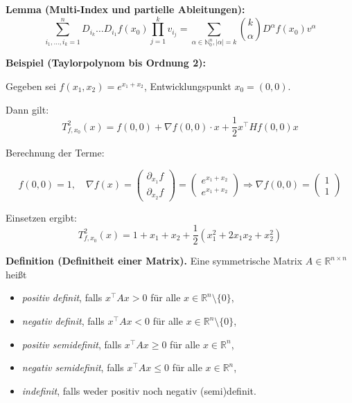 \textbf{Lemma (Multi-Index und partielle Ableitungen):}
\[
\sum_{i_1, \dots, i_k=1}^n D_{i_k} \dots D_{i_1} f(x_0) \prod_{j=1}^k v_{i_j} 
= \sum_{\alpha \in \mathbb{N}_0^n, |\alpha| = k} \binom{k}{\alpha} D^\alpha f(x_0) v^\alpha
\]

\textbf{Beispiel (Taylorpolynom bis Ordnung 2):}

Gegeben sei \( f(x_1, x_2) = e^{x_1 + x_2} \), Entwicklungspunkt \( x_0 = (0, 0) \).

Dann gilt:
\[
T^2_{f, x_0}(x) 
= f(0, 0) 
+ \nabla f(0,0) \cdot x 
+ \frac{1}{2} x^\top Hf(0,0) x
\]

Berechnung der Terme:

\[
f(0,0) = 1, \quad 
\nabla f(x) = \begin{pmatrix} \partial_{x_1} f \\ \partial_{x_2} f \end{pmatrix} 
= \begin{pmatrix} e^{x_1+x_2} \\ e^{x_1+x_2} \end{pmatrix} 
\Rightarrow \nabla f(0,0) = \begin{pmatrix} 1 \\ 1 \end{pmatrix}
\]


Einsetzen ergibt:
\[
T^2_{f, x_0}(x) 
= 1 + x_1 + x_2 + \frac{1}{2} \left( x_1^2 + 2x_1x_2 + x_2^2 \right)
\]

\textbf{Definition (Definitheit einer Matrix).} Eine symmetrische Matrix \( A \in \mathbb{R}^{n \times n} \) heißt
\begin{itemize}
  \item \textit{positiv definit}, falls \( x^\top A x > 0 \) für alle \( x \in \mathbb{R}^n \setminus \{0\} \),
  \item \textit{negativ definit}, falls \( x^\top A x < 0 \) für alle \( x \in \mathbb{R}^n \setminus \{0\} \),
  \item \textit{positiv semidefinit}, falls \( x^\top A x \geq 0 \) für alle \( x \in \mathbb{R}^n \),
  \item \textit{negativ semidefinit}, falls \( x^\top A x \leq 0 \) für alle \( x \in \mathbb{R}^n \),
  \item \textit{indefinit}, falls weder positiv noch negativ (semi)definit.
\end{itemize}


